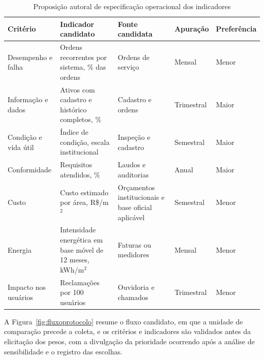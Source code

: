 \begin{table}[htbp]
\centering
\caption{Proposição autoral de especificação operacional dos indicadores}
\label{tab:especificacaoindicadores}
\footnotesize
\begin{tabularx}{\textwidth}{>{\RaggedRight\arraybackslash}p{2.15cm} Y >{\RaggedRight\arraybackslash}p{2.3cm} >{\RaggedRight\arraybackslash}p{1.55cm} >{\RaggedRight\arraybackslash}p{1.7cm}}
\toprule
Critério & Indicador candidato & Fonte candidata & Apuração & Preferência \\
\midrule
Desempenho e falha & Ordens recorrentes por sistema, \% das ordens & Ordens de serviço & Mensal & Menor \\
Informação e dados & Ativos com cadastro e histórico completos, \% & Cadastro e ordens & Trimestral & Maior \\
Condição e vida útil & Índice de condição, escala institucional & Inspeção e cadastro & Semestral & Maior \\
Conformidade & Requisitos atendidos, \% & Laudos e auditorias & Anual & Maior \\
Custo & Custo estimado por área, R\$/m$^2$ & Orçamentos institucionais e base oficial aplicável & Semestral & Menor \\
Energia & Intensidade energética em base móvel de 12 meses, kWh/m$^2$ & Faturas ou medidores & Mensal & Menor \\
Impacto nos usuários & Reclamações por 100 usuários & Ouvidoria e chamados & Trimestral & Menor \\
\bottomrule
\end{tabularx}
\par{}
\end{table}

A Figura~\ref{fig:fluxoprotocolo} resume o fluxo candidato, em que a unidade de comparação precede a coleta, e os critérios e indicadores são validados antes da elicitação dos pesos, com a divulgação da prioridade ocorrendo após a análise de sensibilidade e o registro das escolhas.

